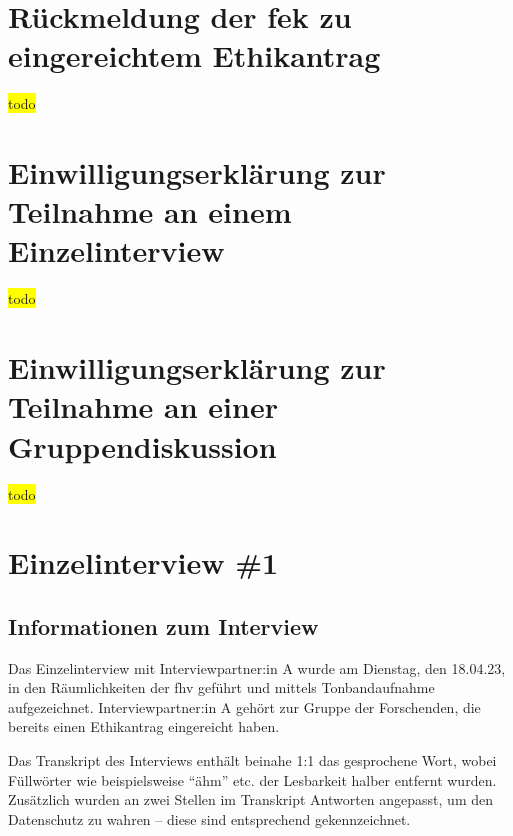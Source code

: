 \documentclass[a4paper,12pt,twoside]{scrreprt}
\begin{document}
\chapter{Rückmeldung der \acs{fek} zu eingereichtem Ethikantrag}
\label{appendix:rückmeldung-fek}

\colorbox{yellow}{todo}



\chapter{Einwilligungserklärung zur Teilnahme an einem Einzelinterview}
\label{appendix:informed-consent-einzelinterview}

\colorbox{yellow}{todo}



\chapter{Einwilligungserklärung zur Teilnahme an einer Gruppendiskussion}
\label{appendix:informed-consent-gruppendiskussion}

\colorbox{yellow}{todo}



\chapter{Einzelinterview \#1}
\label{appendix:interview-1}

\section{Informationen zum Interview}
\label{appendix:interview-1-infos}

Das Einzelinterview mit Interviewpartner:in A wurde am Dienstag, den 18.04.23, in den Räumlichkeiten der \ac{fhv} geführt und mittels Tonbandaufnahme aufgezeichnet. Interviewpartner:in A gehört zur Gruppe der Forschenden, die bereits einen Ethikantrag eingereicht haben.

Das Transkript des Interviews enthält beinahe 1:1 das gesprochene Wort, wobei Füllwörter wie beispielsweise \enquote{ähm} etc. der Lesbarkeit halber entfernt wurden. Zusätzlich wurden an zwei Stellen im Transkript Antworten angepasst, um den Datenschutz zu wahren -- diese sind entsprechend gekennzeichnet.
\end{document}

